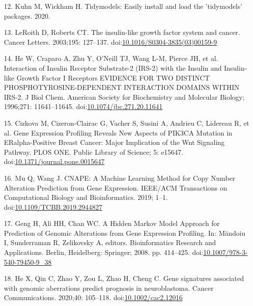 \documentclass[10pt,letterpaper]{article}
\begin{document}
\leavevmode\hypertarget{ref-kuhnTidymodelsEasilyInstall2020}{}%
12. Kuhn M, Wickham H. Tidymodels: Easily install and load the
'tidymodels' packages. 2020.

\leavevmode\hypertarget{ref-leroithInsulinlikeGrowthFactor2003}{}%
13. LeRoith D, Roberts CT. The insulin-like growth factor system and
cancer. Cancer Letters. 2003;195: 127--137.
doi:\href{https://doi.org/10.1016/S0304-3835(03)00159-9}{10.1016/S0304-3835(03)00159-9}

\leavevmode\hypertarget{ref-heInteractionInsulinReceptor1996}{}%
14. He W, Craparo A, Zhu Y, O'Neill TJ, Wang L-M, Pierce JH, et al.
Interaction of Insulin Receptor Substrate-2 (IRS-2) with the Insulin and
Insulin-like Growth Factor I Receptors EVIDENCE FOR TWO DISTINCT
PHOSPHOTYROSINE-DEPENDENT INTERACTION DOMAINS WITHIN IRS-2. J Biol Chem.
American Society for Biochemistry and Molecular Biology; 1996;271:
11641--11645.
doi:\href{https://doi.org/10.1074/jbc.271.20.11641}{10.1074/jbc.271.20.11641}

\leavevmode\hypertarget{ref-cizkovaGeneExpressionProfiling2010}{}%
15. Cizkova M, Cizeron-Clairac G, Vacher S, Susini A, Andrieu C,
Lidereau R, et al. Gene Expression Profiling Reveals New Aspects of
PIK3CA Mutation in ERalpha-Positive Breast Cancer: Major Implication of
the Wnt Signaling Pathway. PLOS ONE. Public Library of Science; 5:
e15647.
doi:\href{https://doi.org/10.1371/journal.pone.0015647}{10.1371/journal.pone.0015647}

\leavevmode\hypertarget{ref-muCNAPEMachineLearning2019}{}%
16. Mu Q, Wang J. CNAPE: A Machine Learning Method for Copy Number
Alteration Prediction from Gene Expression. IEEE/ACM Transactions on
Computational Biology and Bioinformatics. 2019; 1--1.
doi:\href{https://doi.org/10.1109/TCBB.2019.2944827}{10.1109/TCBB.2019.2944827}

\leavevmode\hypertarget{ref-gengHiddenMarkovModel2008}{}%
17. Geng H, Ali HH, Chan WC. A Hidden Markov Model Approach for
Prediction of Genomic Alterations from Gene Expression Profiling. In:
Măndoiu I, Sunderraman R, Zelikovsky A, editors. Bioinformatics Research
and Applications. Berlin, Heidelberg: Springer; 2008. pp. 414--425.
doi:\href{https://doi.org/10.1007/978-3-540-79450-9_38}{10.1007/978-3-540-79450-9\_38}

\leavevmode\hypertarget{ref-heGeneSignaturesAssociated2020}{}%
18. He X, Qin C, Zhao Y, Zou L, Zhao H, Cheng C. Gene signatures
associated with genomic aberrations predict prognosis in neuroblastoma.
Cancer Communications. 2020;40: 105--118.
doi:\href{https://doi.org/10.1002/cac2.12016}{10.1002/cac2.12016}

\nolinenumbers
\end{document}
